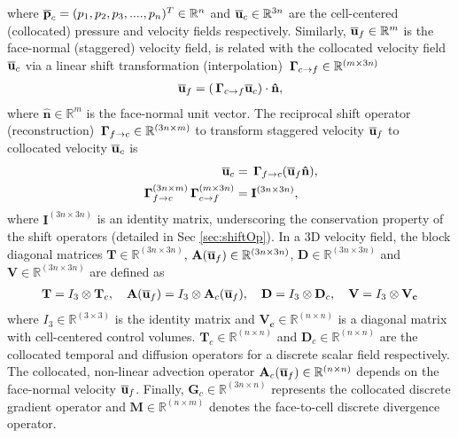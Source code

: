 where $\overline{\mathbf{p}}_c= (p_1, p_2, p_3, ...., p_n)^T \in \mathbb{R}^n$ and $\overline{\mathbf{u}}_c \in \mathbb{R}^{3n}$ are the cell-centered (collocated) pressure and velocity fields respectively. Similarly, $\overline{\mathbf{u}}_f \in \mathbb{R}^m$ is the face-normal (staggered) velocity field, is related with the collocated velocity field $\overline{\mathbf{u}}_c$ via a linear shift transformation (interpolation) $\, \mathbf{\Gamma}_{c \rightarrow f} \in \mathbb{R}^{(m \times 3n)} $
\begin{align}
\overline{\mathbf{u}}_f = (\, \mathbf{\Gamma}_{c \rightarrow f} \overline{\mathbf{u}}_c) \cdot \mathbf{\hat{n}},
\label{eqn:shiftCS}
\end{align}
where $\mathbf{\hat{n}} \in \mathbb{R}^m$ is the face-normal unit vector. The reciprocal shift operator (reconstruction) $\, \mathbf{\Gamma}_{f \rightarrow c} \in \mathbb{R}^{(3n \times m)}$ to transform staggered velocity $\overline{\mathbf{u}}_f$ to collocated velocity $\overline{\mathbf{u}}_c$ is
\begin{align}
\begin{split}
\overline{\mathbf{u}}_c &= \, \mathbf{\Gamma}_{f \rightarrow c} (\overline{\mathbf{u}}_f \mathbf{\hat{n}}),
\\
\, \mathbf{\Gamma}_{f \rightarrow c}^{(3n \times m)} \, \mathbf{\Gamma}_{c \rightarrow f}^{(m \times 3n)} &= \mathbf{I}^{(3n \times 3n)},
\end{split}
\label{eqn:shiftSC}
\end{align}
where $\mathbf{I}^{(3n \times 3n)}$ is an identity matrix, underscoring the conservation property of the shift operators (detailed in Sec \ref{sec:shiftOp}). In a 3D velocity field, the block diagonal matrices $ \mathbf{T} \in \mathbb{R}^{(3n \times 3n)}$, $\mathbf{A}(\overline{\mathbf{u}}_f) \in \mathbb{R}^{(3n \times 3n)}$, $\mathbf{D} \in \mathbb{R}^{(3n \times 3n)}$ and $\mathbf{V} \in \mathbb{R}^{(3n \times 3n)}$ are defined as
\begin{align}
\mathbf{T} = I_3 \otimes \mathbf{T}_c, 
\quad
\mathbf{A}( \overline{\mathbf{u}}_f ) = I_3 \otimes \mathbf{A}_c ( \overline{\mathbf{u}}_f ), 
\quad
\mathbf{D} = I_3 \otimes \mathbf{D}_c,
\quad
\mathbf{V} = I_3 \otimes \mathbf{V_{c}}
\end{align}
where $I_3 \in \mathbb{R}^{(3 \times 3)}$ is the identity matrix and $\mathbf{V_{c}} \in \mathbb{R}^{(n \times n)}$ is a diagonal matrix with cell-centered control volumes. $\mathbf{T}_c \in \mathbb{R}^{(n \times n)}$ and $\mathbf{D}_c \in \mathbb{R}^{(n \times n)}$ are the collocated temporal and diffusion operators for a discrete scalar field respectively. The collocated, non-linear advection operator $\mathbf{A}_c( \overline{\mathbf{u}}_f ) \in \mathbb{R}^{(n \times n)}$ depends on the face-normal velocity $\overline{\mathbf{u}}_f$. Finally, $\mathbf{G}_c \in \mathbb{R}^{(3n \times n)}$ represents the collocated discrete gradient operator and $\mathbf{M} \in \mathbb{R}^{(n \times m)}$ denotes the face-to-cell discrete divergence operator.

